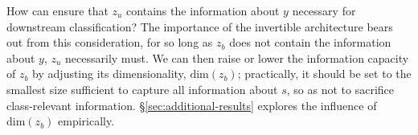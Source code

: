 How can ensure that $z_u$ contains the information about $y$ necessary for downstream
classification?
%
The importance of the invertible architecture bears out from this consideration, for so long as
$z_b$ does not contain the information about $y$, $z_u$ necessarily must.
%
We can then raise or lower the information capacity of $z_b$ by adjusting its dimensionality, \(
\text{dim}(z_b) \); practically, it should be set to the smallest size sufficient to capture all
information about $s$, so as not to sacrifice class-relevant information. 
%
\S\ref{sec:additional-results} explores the influence of \( \mathrm{dim}(z_b) \) empirically.
%

